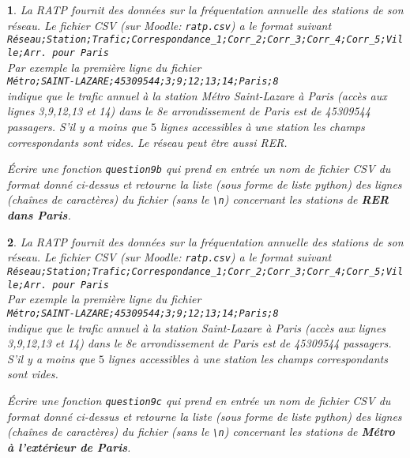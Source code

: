 \documentclass[10pt]{article}
\newtheorem{exi}{}
\newenvironment{exo}{\begin{exi}\em}{\end{exi}}
\begin{document}
\vspace*{-2ex}
\begin{exo}
    La RATP fournit des données sur la fréquentation annuelle des stations de son
réseau. Le fichier CSV (sur Moodle: \verb+ratp.csv+) a le format suivant\\
\verb+Réseau;Station;Trafic;Correspondance_1;Corr_2;Corr_3;Corr_4;Corr_5;Ville;Arr. pour Paris+\\
Par exemple la première ligne du fichier\\
\verb+Métro;SAINT-LAZARE;45309544;3;9;12;13;14;Paris;8+\\
indique que le trafic annuel à la station Métro Saint-Lazare à Paris (accès aux lignes 3,9,12,13 et 14) dans le 8e arrondissement de Paris est de 45309544 passagers.
S'il y a moins que $5$ lignes accessibles à une station les champs correspondants sont vides. Le réseau peut être aussi RER.

Écrire une fonction {\tt question9b} qui prend en entrée un nom de fichier CSV
du format donné ci-dessus
et retourne la liste (sous forme de liste python) des lignes (chaînes
de caractères) du fichier (sans le \verb+\n+)
concernant les stations de {\bf RER dans Paris}.
\end{exo}
\vspace*{-2ex}
\begin{exo}
    La RATP fournit des données sur la fréquentation annuelle des stations de son réseau. Le fichier CSV (sur Moodle: \verb+ratp.csv+) a le format suivant\\
\verb+Réseau;Station;Trafic;Correspondance_1;Corr_2;Corr_3;Corr_4;Corr_5;Ville;Arr. pour Paris+\\
Par exemple la première ligne du fichier\\
\verb+Métro;SAINT-LAZARE;45309544;3;9;12;13;14;Paris;8+\\
indique que le trafic annuel à la station Saint-Lazare à Paris (accès aux lignes 3,9,12,13 et 14) dans le 8e arrondissement de Paris est de 45309544 passagers. S'il y a moins que $5$ lignes accessibles à une station les champs correspondants sont vides. 

Écrire une fonction {\tt question9c} qui prend en entrée un nom de fichier CSV
du format donné ci-dessus
et retourne la liste (sous forme de liste python) des lignes (chaînes
de caractères) du fichier (sans le \verb+\n+)
concernant les stations de {\bf Métro à l'extérieur de Paris}.
\end{exo}
\vspace*{-2ex}
\end{document}
